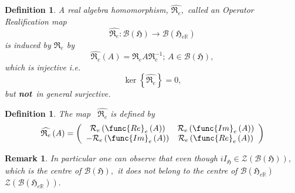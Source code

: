 \documentclass[aps,preprint]{revtex4}
\newtheorem{definition}[theorem]{Definition}
\newtheorem{remark}[theorem]{Remark}
\begin{document}
\begin{definition}
A \emph{real algebra homomorphism, }$\widehat{\mathfrak{R}_{e}},$ called an 
\emph{Operator} \emph{Realification} map \emph{\ }%
\begin{equation}
\widehat{\mathfrak{R}_{e}}:\mathcal{B}\left( \mathfrak{H}\right) \rightarrow 
\mathcal{B}\left( \mathfrak{H}_{e\mathbb{R}}\right)
\end{equation}%
\emph{is }induced by $\mathfrak{R}_{e}$ by 
\begin{equation}
\widehat{\mathfrak{R}_{e}}\left( A\right) =\mathfrak{R}_{e}A\mathfrak{R}%
_{e}^{-1};\,A\in \mathcal{B}\left( \mathfrak{H}\right) ,
\end{equation}%
\emph{which is injective i.e. }%
\begin{equation}
\ker \left\{ \widehat{\mathfrak{R}_{e}}\right\} =0,
\end{equation}%
\emph{but} \textbf{not}\emph{\ in general surjective. }
\end{definition}

\begin{definition}
The map \emph{\ }$\widehat{\mathfrak{R}_{e}}$ is defined by 
\begin{equation}
\widehat{\mathfrak{R}_{e}}\left( A\right) =\left( 
\begin{array}{cc}
\mathcal{R}_{e}\left( \func{Re}_{e}\left( A\right) \right) & \mathcal{R}%
_{e}\left( \func{Im}_{e}\left( A\right) \right) \\ 
-\mathcal{R}_{e}\left( \func{Im}_{e}\left( A\right) \right) & \mathcal{R}%
_{e}\left( \func{Re}_{e}\left( A\right) \right)%
\end{array}%
\right)
\end{equation}
\end{definition}

\begin{remark}
\emph{In particular one can observe that even though }$iI_{\mathfrak{H}}\in 
\mathcal{Z}\left( \mathcal{B}\left( \mathfrak{H}\right) \right) ,$ which is
the centre of $\mathcal{B}\left( \mathfrak{H}\right) ,$ \emph{it does not
belong to } the centre of $\mathcal{B}\left( \mathfrak{H}_{e\mathbb{R}%
}\right) $ $\mathcal{Z}\left( \mathcal{B}\left( \mathfrak{H}_{e\mathbb{R}%
}\right) \right) .$
\end{remark}
\end{document}
